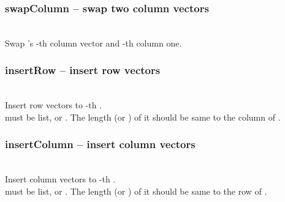   \subsubsection{swapColumn -- swap two column vectors}
   \\
   \spacing
   \quad Swap 's -th column vector and -th column one.\\
   \spacing
  \subsubsection{insertRow -- insert row vectors}
   \\
   \spacing
   \quad Insert row vectors  to -th .\\
   \spacing
    must be list,  or .
    The length (or ) of it should be same to the column of . 
  \subsubsection{insertColumn -- insert column vectors}
   \\
   \spacing
   \quad Insert column vectors  to -th .\\
   \spacing
    must be list,  or .
    The length (or ) of it should be same to the row of . 
